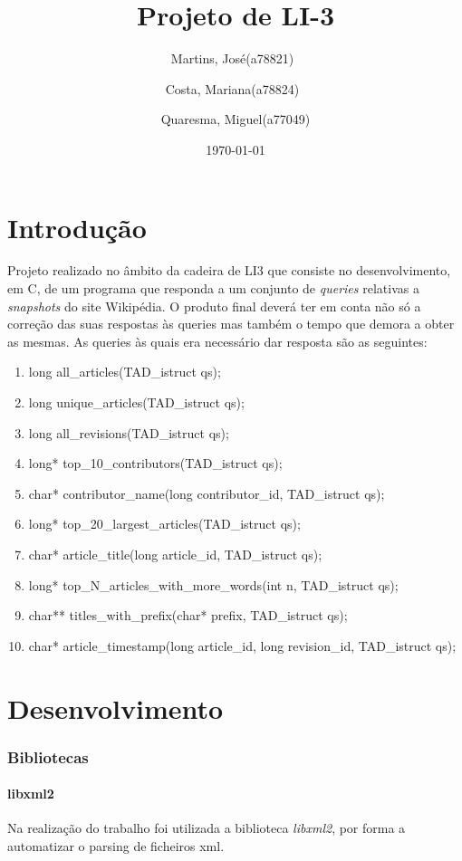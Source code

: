 \documentclass{report}
\title{Projeto de LI-3}
\author{Martins, José(a78821)\
        \and 
        Costa, Mariana(a78824)\
        \and 
        Quaresma, Miguel(a77049)
        }
\date{\today}                   %
\begin{document}
\begin{titlepage}
\maketitle
\end{titlepage}

\tableofcontents

\part{Introdução}
\justify
Projeto realizado no âmbito da cadeira de LI3 que consiste no desenvolvimento, em C, de um programa que responda a um conjunto de \textit{queries} relativas a \textit{snapshots} do site Wikipédia. O produto final deverá ter em conta não só a correção das suas respostas às queries mas também o tempo que demora a obter as mesmas.
As queries às quais era necessário dar resposta são as seguintes:
\begin{enumerate}
    \item long all\_articles(TAD\_istruct qs);
    \item long unique\_articles(TAD\_istruct qs);
    \item long all\_revisions(TAD\_istruct qs);
    \item long* top\_10\_contributors(TAD\_istruct qs);
    \item char* contributor\_name(long contributor\_id, TAD\_istruct qs);
    \item long* top\_20\_largest\_articles(TAD\_istruct qs);
    \item char* article\_title(long article\_id, TAD\_istruct qs);
    \item long* top\_N\_articles\_with\_more\_words(int n, TAD\_istruct qs);
    \item char** titles\_with\_prefix(char* prefix, TAD\_istruct qs);
    \item char* article\_timestamp(long article\_id, long revision\_id, TAD\_istruct qs);
\end{enumerate}


\part{Desenvolvimento}
\section{Bibliotecas}

\subsection{libxml2}
Na realização do trabalho foi utilizada a biblioteca \emph{libxml2}, por forma a automatizar o parsing de ficheiros xml.
\end{document}
